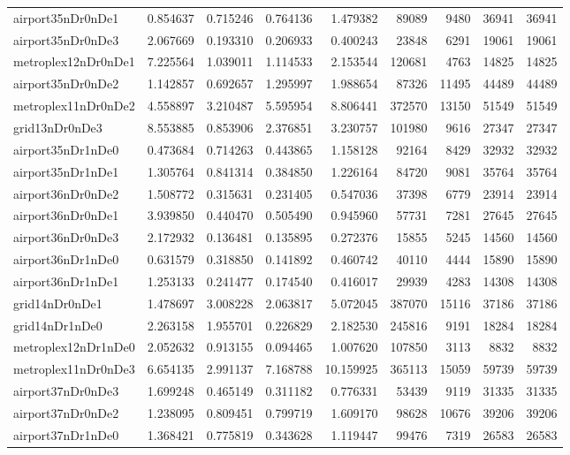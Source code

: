 \begin{longtable}{|l|r|r|r|r|r|r|r|r|}
airport35nDr0nDe1 & 0.854637 & 0.715246 & 0.764136 & 1.479382 & 89089 & 9480 & 36941 & 36941 \\
airport35nDr0nDe3 & 2.067669 & 0.193310 & 0.206933 & 0.400243 & 23848 & 6291 & 19061 & 19061 \\
metroplex12nDr0nDe1 & 7.225564 & 1.039011 & 1.114533 & 2.153544 & 120681 & 4763 & 14825 & 14825 \\
airport35nDr0nDe2 & 1.142857 & 0.692657 & 1.295997 & 1.988654 & 87326 & 11495 & 44489 & 44489 \\
metroplex11nDr0nDe2 & 4.558897 & 3.210487 & 5.595954 & 8.806441 & 372570 & 13150 & 51549 & 51549 \\
grid13nDr0nDe3 & 8.553885 & 0.853906 & 2.376851 & 3.230757 & 101980 & 9616 & 27347 & 27347 \\
airport35nDr1nDe0 & 0.473684 & 0.714263 & 0.443865 & 1.158128 & 92164 & 8429 & 32932 & 32932 \\
airport35nDr1nDe1 & 1.305764 & 0.841314 & 0.384850 & 1.226164 & 84720 & 9081 & 35764 & 35764 \\
airport36nDr0nDe2 & 1.508772 & 0.315631 & 0.231405 & 0.547036 & 37398 & 6779 & 23914 & 23914 \\
airport36nDr0nDe1 & 3.939850 & 0.440470 & 0.505490 & 0.945960 & 57731 & 7281 & 27645 & 27645 \\
airport36nDr0nDe3 & 2.172932 & 0.136481 & 0.135895 & 0.272376 & 15855 & 5245 & 14560 & 14560 \\
airport36nDr1nDe0 & 0.631579 & 0.318850 & 0.141892 & 0.460742 & 40110 & 4444 & 15890 & 15890 \\
airport36nDr1nDe1 & 1.253133 & 0.241477 & 0.174540 & 0.416017 & 29939 & 4283 & 14308 & 14308 \\
grid14nDr0nDe1 & 1.478697 & 3.008228 & 2.063817 & 5.072045 & 387070 & 15116 & 37186 & 37186 \\
grid14nDr1nDe0 & 2.263158 & 1.955701 & 0.226829 & 2.182530 & 245816 & 9191 & 18284 & 18284 \\
metroplex12nDr1nDe0 & 2.052632 & 0.913155 & 0.094465 & 1.007620 & 107850 & 3113 & 8832 & 8832 \\
metroplex11nDr0nDe3 & 6.654135 & 2.991137 & 7.168788 & 10.159925 & 365113 & 15059 & 59739 & 59739 \\
airport37nDr0nDe3 & 1.699248 & 0.465149 & 0.311182 & 0.776331 & 53439 & 9119 & 31335 & 31335 \\
airport37nDr0nDe2 & 1.238095 & 0.809451 & 0.799719 & 1.609170 & 98628 & 10676 & 39206 & 39206 \\
airport37nDr1nDe0 & 1.368421 & 0.775819 & 0.343628 & 1.119447 & 99476 & 7319 & 26583 & 26583 \\

\end{longtable}
